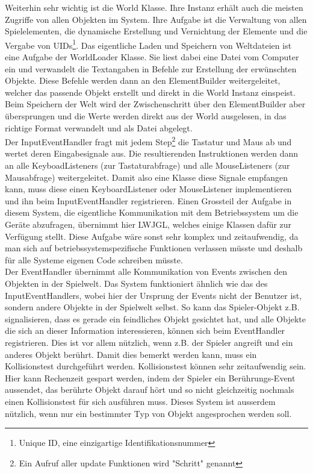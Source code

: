 \documentclass[12pt,a4paper,titlepage]{article}
\begin{document}
		Weiterhin sehr wichtig ist die World Klasse. Ihre Instanz erhält auch die meisten Zugriffe von allen Objekten im System. Ihre Aufgabe ist die Verwaltung von allen Spielelementen, die dynamische Erstellung und Vernichtung der Elemente und die Vergabe von UIDs\footnote{Unique ID, eine einzigartige Identifikationsnummer}. Das eigentliche Laden und Speichern von Weltdateien ist eine Aufgabe der WorldLoader Klasse. Sie liest dabei eine Datei vom Computer ein und verwandelt die Textangaben in Befehle zur Erstellung der erwünschten Objekte. Diese Befehle werden dann an den ElementBuilder weitergeleitet, welcher das passende Objekt erstellt und direkt in die World Instanz einspeist. Beim Speichern der Welt wird der Zwischenschritt über den ElementBuilder aber übersprungen und die Werte werden direkt aus der World ausgelesen, in das richtige Format verwandelt und als Datei abgelegt.\\
		
		Der InputEventHandler fragt mit jedem Step\footnote{Ein Aufruf aller update Funktionen wird "Schritt" genannt} die Tastatur und Maus ab und wertet deren Eingabesignale aus. Die resultierenden Instruktionen werden dann an alle KeyboadListeners (zur Tastaturabfrage) und alle MouseListeners (zur Mausabfrage) weitergeleitet. Damit also eine Klasse diese Signale empfangen kann, muss diese einen KeyboardListener oder MouseListener implementieren und ihn beim InputEventHandler registrieren. Einen Grossteil der Aufgabe in diesem System, die eigentliche Kommunikation mit dem Betriebssystem um die Geräte abzufragen, übernimmt hier LWJGL, welches einige Klassen dafür zur Verfügung stellt. Diese Aufgabe wäre sonst sehr komplex und zeitaufwendig, da man sich auf betriebssystemspezifische Funktionen verlassen müsste und deshalb für alle Systeme eigenen Code schreiben müsste.\\
		
		Der EventHandler übernimmt alle Kommunikation von Events zwischen den Objekten in der Spielwelt. Das System funktioniert ähnlich wie das des InputEventHandlers, wobei hier der Ursprung der Events nicht der Benutzer ist, sondern andere Objekte in der Spielwelt selbst. So kann das Spieler-Objekt z.B. signalisieren, dass es gerade ein feindliches Objekt gesichtet hat, und alle Objekte die sich an dieser Information interessieren, können sich beim EventHandler registrieren. Dies ist vor allem nützlich, wenn z.B. der Spieler angreift und ein anderes Objekt berührt. Damit dies bemerkt werden kann, muss ein Kollisionstest durchgeführt werden. Kollisionstest können sehr zeitaufwendig sein. Hier kann Rechenzeit gespart werden, indem der Spieler ein Berührungs-Event aussendet, das berührte Objekt darauf hört und so nicht gleichzeitig nochmals einen Kollisionstest für sich ausführen muss. Dieses System ist ausserdem nützlich, wenn nur ein bestimmter Typ von Objekt angesprochen werden soll.\\
		
\end{document}
